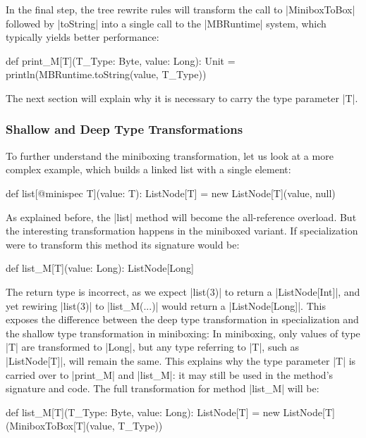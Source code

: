 In the final step, the tree rewrite rules will transform the call to |MiniboxToBox| followed by |toString| into a single call to the |MBRuntime| system, which typically yields better performance:

\begin{lstlisting-nobreak}
 def print_M[T](T_Type: Byte, value: Long): Unit = println(MBRuntime.toString(value, T_Type))
\end{lstlisting-nobreak}

The next section will explain why it is necessary to carry the type parameter |T|.

\subsubsection*{Shallow and Deep Type Transformations}
\label{mbox:sec-mb-traf-shallow}

To further understand the miniboxing transformation, let us look at a more complex example, which builds a linked list with a single element:

\begin{lstlisting-nobreak}
 def list[@minispec T](value: T): ListNode[T] = new ListNode[T](value, null)
\end{lstlisting-nobreak}

As explained before, the |list| method will become the all-reference overload. But the interesting transformation happens in the miniboxed variant. If specialization were to transform this method its signature would be:

\begin{lstlisting-nobreak}
 def list_M[T](value: Long): ListNode[Long]
\end{lstlisting-nobreak}

The return type is incorrect, as we expect |list(3)| to return a |ListNode[Int]|, and yet rewiring |list(3)| to |list_M(...)| would return a |ListNode[Long]|. This exposes the difference between the deep type transformation in specialization and the shallow type transformation in miniboxing: In miniboxing, only values of type |T| are transformed to |Long|, but any type referring to |T|, such as |ListNode[T]|, will remain the same. This explains why the type parameter |T| is carried over to |print_M| and |list_M|: it may still be used in the method's signature and code. The full transformation for method |list_M| will be:

\begin{lstlisting-nobreak}
 def list_M[T](T_Type: Byte, value: Long): ListNode[T] =
   new ListNode[T](MiniboxToBox[T](value, T_Type))
\end{lstlisting-nobreak}

